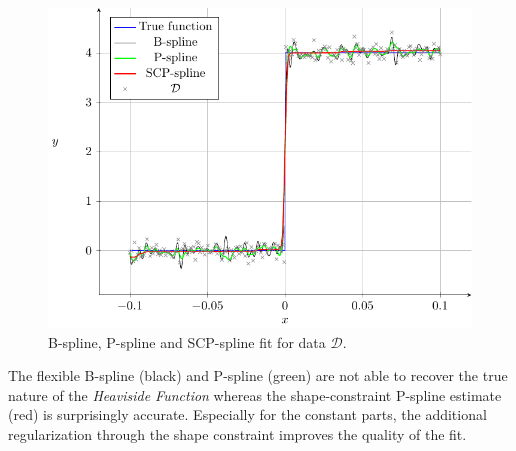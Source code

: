 \begin{figure}[H]
	\centering
	\includegraphics{graphics/pgfplots/cha4/exp-heaviside.pdf}
	\caption{B-spline, P-spline and SCP-spline fit for data $\mathcal{D}$.}
	\label{fig:example-heaviside}
\end{figure}

The flexible B-spline (black) and P-spline (green) are not able to recover the true nature of the \emph{Heaviside Function} whereas the shape-constraint P-spline estimate (red) is surprisingly accurate. Especially for the constant parts, the additional regularization through the shape constraint improves the quality of the fit. 
